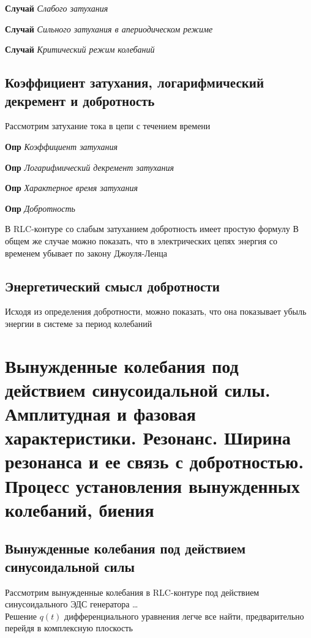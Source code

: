 \documentclass[a4paper, 14pt]{article}
\begin{document}
    \textbf{Случай} \textit{Слабого затухания}
    
    \textbf{Случай} \textit{Сильного затухания в апериодическом режиме}
    
    \textbf{Случай} \textit{Критический режим колебаний}
    
    \subsection{Коэффициент затухания, логарифмический декремент и добротность}
    
    Рассмотрим затухание тока в цепи с течением времени
    
    \textbf{Опр} \textit{Коэффициент затухания}
    
    \textbf{Опр} \textit{Логарифмический декремент затухания}
    
    \textbf{Опр} \textit{Характерное время затухания}
    
    \textbf{Опр} \textit{Добротность}
    
    В RLC-контуре со слабым затуханием добротность имеет простую формулу
    В общем же случае можно показать, что в электрических цепях энергия со временем убывает по закону Джоуля-Ленца
    
    \subsection{Энергетический смысл добротности}
    
    Исходя из определения добротности, можно показать, что она показывает убыль энергии в системе за период колебаний
    
    \section{Вынужденные колебания под действием синусоидальной силы.
    Амплитудная и фазовая характеристики.
    Резонанс.
    Ширина резонанса и ее связь с добротностью.
    Процесс установления вынужденных колебаний, биения}
    
    \subsection{Вынужденные колебания под действием синусоидальной силы}
    
    Рассмотрим вынужденные колебания в RLC-контуре под действием синусоидального ЭДС генератора \ldots \\
    Решение $q(t)$ дифференциального уравнения легче все найти, предварительно перейдя в комплексную плоскость
    
\end{document}
